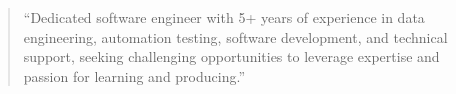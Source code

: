 \documentclass[10pt,a4paper,ragged2e,withhyper]{altacv}
\begin{document}
\begin{paracol}{2}






\switchcolumn


\begin{quote}
``Dedicated software engineer with 5+ years of experience in data engineering, automation testing, software development, and technical support, seeking challenging opportunities to leverage expertise and passion for learning and producing.''
\end{quote}








\\

\divider\smallskip

\\


\divider

\divider


\end{paracol}
\end{document}

